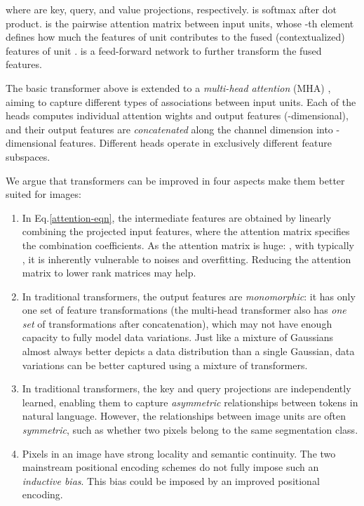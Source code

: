 \documentclass{article}
\begin{document}
where  are key, query, and value projections, respectively.  is softmax after dot product.  is the pairwise attention matrix between input units, whose -th element defines how much the features of unit  contributes to the fused (contextualized) features of unit .   is a feed-forward network to further transform the fused features.

The basic transformer above is extended to a \emph{multi-head attention} (MHA) \cite{transformer,analyze-multi-head}, aiming to capture different types of associations between input units. Each of the  heads computes individual attention wights and output features (-dimensional), and their output features are \emph{concatenated} along the channel dimension into -dimensional features. Different heads operate in exclusively different feature subspaces. 

We argue that transformers can be improved in four aspects make them better suited for images:
\begin{enumerate}
\item In Eq.\eqref{attention-eqn}, the intermediate features  are obtained by linearly combining the projected input features, where the attention matrix specifies the combination coefficients. As the attention matrix is huge: , with typically , it is inherently vulnerable to noises and  overfitting. Reducing the attention matrix to lower rank matrices may help.
\item In traditional transformers, the output features are \emph{monomorphic}: it has only one set of feature transformations (the multi-head transformer also has \emph{one set} of transformations after concatenation), which may not have enough capacity to fully model data variations. Just like a mixture of Gaussians almost always better depicts a data distribution than a single Gaussian, data variations can be better captured using a mixture of  transformers.
\item In traditional transformers, the key and query projections are independently learned, enabling them to capture \emph{asymmetric} relationships between tokens in natural language. However, the relationships between image units are often \emph{symmetric}, such as whether two pixels belong to the same segmentation class.
\item Pixels in an image have strong locality and semantic continuity. The two mainstream positional encoding schemes \cite{detr,vision-trans} do not fully impose such an \emph{inductive bias}. This bias could be imposed by an improved positional encoding.
\end{enumerate}
\end{document}
